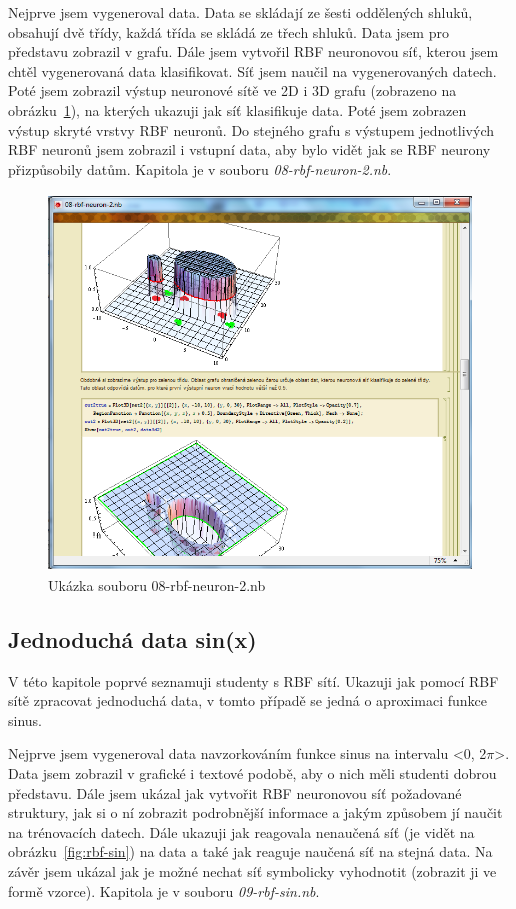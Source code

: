 \documentclass[11pt,twoside,a4paper]{book}
\begin{document}
Nejprve jsem vygeneroval data. Data se skládají ze šesti oddělených shluků, obsahují dvě třídy, každá třída se skládá ze třech shluků. Data jsem pro představu zobrazil v grafu. Dále jsem vytvořil RBF neuronovou síť, kterou jsem chtěl vygenerovaná data klasifikovat. Síť jsem naučil na vygenerovaných datech. Poté jsem zobrazil výstup neuronové sítě ve 2D i 3D grafu (zobrazeno na obrázku~\ref{fig:rbf-neuron2}), na kterých ukazuji jak síť klasifikuje data. Poté jsem zobrazen výstup skryté vrstvy RBF neuronů. Do stejného grafu s výstupem jednotlivých RBF neuronů jsem zobrazil i vstupní data, aby bylo vidět jak se RBF neurony přizpůsobily datům. Kapitola je v souboru \textit{08-rbf-neuron-2.nb}.

\begin{figure}[h!]
\begin{center}
\includegraphics[height=10cm]{figures/ukazka08.png}
\caption{Ukázka souboru 08-rbf-neuron-2.nb}
\label{fig:rbf-neuron2}
\end{center}
\end{figure}

\subsection{Jednoduchá data sin(x)}
V této kapitole poprvé seznamuji studenty s RBF sítí. Ukazuji jak pomocí RBF sítě zpracovat jednoduchá data, v tomto případě se jedná o aproximaci funkce sinus.

Nejprve jsem vygeneroval data navzorkováním funkce sinus na intervalu <0, 2\begin{math}\pi \end{math}>. Data jsem zobrazil v grafické i textové podobě, aby o nich měli studenti dobrou představu. Dále jsem ukázal jak vytvořit RBF neuronovou síť požadované struktury, jak si o ní zobrazit podrobnější informace a jakým způsobem jí naučit na trénovacích datech. Dále ukazuji jak reagovala nenaučená síť (je vidět na obrázku~\ref{fig:rbf-sin}) na data a také jak reaguje naučená síť na stejná data. Na závěr jsem ukázal jak je možné nechat síť symbolicky vyhodnotit (zobrazit ji ve formě vzorce). Kapitola je v souboru \textit{09-rbf-sin.nb}.
\end{document}
